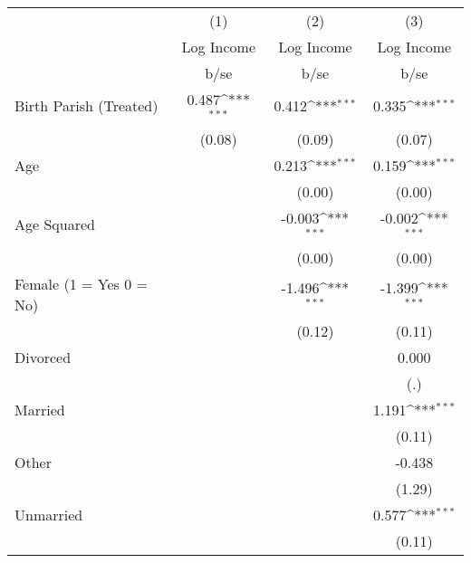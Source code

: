 {
\def\sym#1{\ifmmode^{#1}\else\(^{#1}\)\fi}
\begin{tabular}{l*{3}{c}}
\hline\hline
                    &\multicolumn{1}{c}{(1)}&\multicolumn{1}{c}{(2)}&\multicolumn{1}{c}{(3)}\\
                    &\multicolumn{1}{c}{Log Income}&\multicolumn{1}{c}{Log Income}&\multicolumn{1}{c}{Log Income}\\
                    &        b/se         &        b/se         &        b/se         \\
\hline
Birth Parish (Treated)&       0.487\sym{***}&       0.412\sym{***}&       0.335\sym{***}\\
                    &      (0.08)         &      (0.09)         &      (0.07)         \\
Age                 &                     &       0.213\sym{***}&       0.159\sym{***}\\
                    &                     &      (0.00)         &      (0.00)         \\
Age Squared         &                     &      -0.003\sym{***}&      -0.002\sym{***}\\
                    &                     &      (0.00)         &      (0.00)         \\
Female (1 = Yes 0 = No)&                     &      -1.496\sym{***}&      -1.399\sym{***}\\
                    &                     &      (0.12)         &      (0.11)         \\
Divorced            &                     &                     &       0.000         \\
                    &                     &                     &         (.)         \\
Married             &                     &                     &       1.191\sym{***}\\
                    &                     &                     &      (0.11)         \\
Other               &                     &                     &      -0.438         \\
                    &                     &                     &      (1.29)         \\
Unmarried           &                     &                     &       0.577\sym{***}\\
                    &                     &                     &      (0.11)         \\

\end{tabular}}
